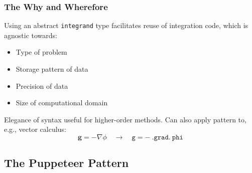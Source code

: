 \documentclass[12pt]{beamer}
\begin{document}
\begin{frame}
  \frametitle{The Why and Wherefore}
  Using an abstract \texttt{integrand} type facilitates reuse of
  integration code, which is agnostic towards:
  
  \begin{itemize}
  \item Type of problem
  \item Storage pattern of data
  \item Precision of data
  \item Size of computational domain
  \end{itemize}
  
  Elegance of syntax useful for higher-order methods. Can also apply
  pattern to, e.g., vector calculus:
  $$ \bm{g} = -\nabla\phi \quad \rightarrow \quad \mathtt{g = -\
    .grad.\ phi} $$
\end{frame}

\subsection{The Puppeteer Pattern}
\end{document}
